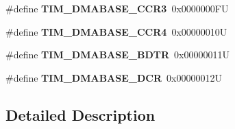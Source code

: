 \begin{DoxyCompactItemize}
\#define {\bfseries T\+I\+M\+\_\+\+D\+M\+A\+B\+A\+S\+E\+\_\+\+C\+C\+R3}~0x0000000\+FU
\item 
\mbox{\label{group___t_i_m___d_m_a___base__address_gaea24fd3f528163da065cbdce3c68ef23}} 
\#define {\bfseries T\+I\+M\+\_\+\+D\+M\+A\+B\+A\+S\+E\+\_\+\+C\+C\+R4}~0x00000010U
\item 
\mbox{\label{group___t_i_m___d_m_a___base__address_ga767eab033d485d32de80b46f70be3341}} 
\#define {\bfseries T\+I\+M\+\_\+\+D\+M\+A\+B\+A\+S\+E\+\_\+\+B\+D\+TR}~0x00000011U
\item 
\mbox{\label{group___t_i_m___d_m_a___base__address_gab3e5aaf0cb815b4a2469d3046eca0201}} 
\#define {\bfseries T\+I\+M\+\_\+\+D\+M\+A\+B\+A\+S\+E\+\_\+\+D\+CR}~0x00000012U
\end{DoxyCompactItemize}


\subsection{Detailed Description}
